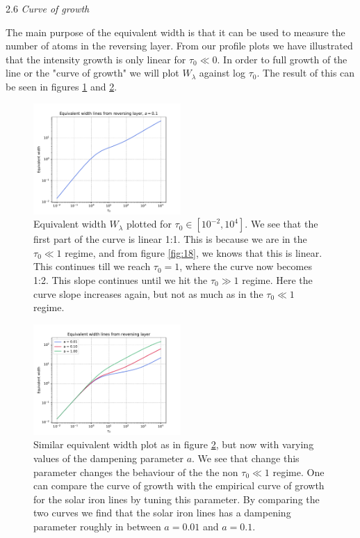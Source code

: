 \documentclass[a4paper,11.5pt,]{article}
\begin{document}
\begin{multicols}{2}
\begin{center}
2.6\textit{ Curve of growth}
\end{center}
The main purpose of the equivalent width is that it can be used to measure the number of atoms in the reversing layer. From our profile plots we have illustrated that the intensity growth is only linear for $\tau_0 \ll 0$. In order to full growth of the line or the "curve of growth" we will plot $W_\lambda$ against log $\tau_0$. The result of this can be seen in figures \ref{fig:27} and \ref{fig:28}.

\begin{figure}[H]
	\centering
	\includegraphics[width=0.5\textwidth]{SSA/figures/growth.pdf}
	\caption{Equivalent width $W_\lambda$ plotted for $\tau_0 \in [10^{-2}, 10^4]$. We see that the first part of the curve is linear 1:1. This is because we are in the $\tau_0 \ll 1$ regime, and from figure \ref{fig:18}, we knows that this is linear. This continues till we reach $\tau_0 = 1$, where the curve now becomes 1:2. This slope continues until we hit the $\tau_0 \gg 1$ regime. Here the curve slope increases again, but not as much as in the $\tau_0 \ll 1$ regime.}
	\label{fig:27}
\end{figure}

\begin{figure}[H]
	\centering
	\includegraphics[width=0.5\textwidth]{SSA/figures/growthmulti.pdf}
	\caption{Similar equivalent width plot as in figure \ref{fig:28}, but now with varying values of the dampening parameter $a$. We see that change this parameter changes the behaviour of the the non $\tau_0 \ll 1$ regime. One can compare the curve of growth with the empirical curve of growth for the solar iron lines by tuning this parameter. By comparing the two curves we find that the solar iron lines has a dampening parameter roughly in between $a = 0.01$ and $a = 0.1$. }
	\label{fig:28}
\end{figure}


\end{multicols}
\end{document}
